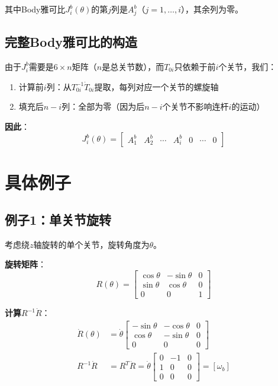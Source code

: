 \documentclass[12pt,a4paper]{article}
\begin{document}
其中Body雅可比$J_i^b(\theta)$的第$j$列是$A_j^b$（$j = 1, \ldots, i$），其余列为零。

\subsection{完整Body雅可比的构造}

由于$J_i^b$需要是$6 \times n$矩阵（$n$是总关节数），而$T_{0i}$只依赖于前$i$个关节，我们：

\begin{enumerate}
\item 计算前$i$列：从$T_{0i}^{-1}\dot{T}_{0i}$提取，每列对应一个关节的螺旋轴
\item 填充后$n-i$列：全部为零（因为后$n-i$个关节不影响连杆$i$的运动）
\end{enumerate}

\textbf{因此}：
\begin{equation}
J_i^b(\theta) = \begin{bmatrix} A_1^b & A_2^b & \cdots & A_i^b & 0 & \cdots & 0 \end{bmatrix}
\end{equation}

\section{具体例子}

\subsection{例子1：单关节旋转}

考虑绕$z$轴旋转的单个关节，旋转角度为$\theta$。

\textbf{旋转矩阵}：
\begin{equation}
R(\theta) = \begin{bmatrix}
\cos\theta & -\sin\theta & 0 \\
\sin\theta & \cos\theta & 0 \\
0 & 0 & 1
\end{bmatrix}
\end{equation}

\textbf{计算$R^{-1}\dot{R}$}：
\begin{align}
\dot{R}(\theta) &= \dot{\theta} \begin{bmatrix}
-\sin\theta & -\cos\theta & 0 \\
\cos\theta & -\sin\theta & 0 \\
0 & 0 & 0
\end{bmatrix} \\
R^{-1} \dot{R} &= R^T \dot{R} = \dot{\theta} \begin{bmatrix}
0 & -1 & 0 \\
1 & 0 & 0 \\
0 & 0 & 0
\end{bmatrix} = [\omega_b]
\end{align}
\end{document}
